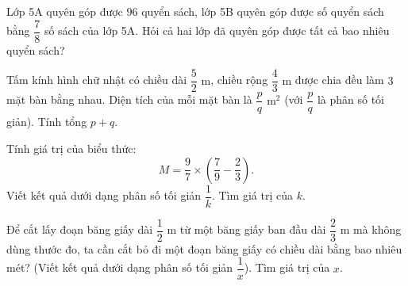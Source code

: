\begin{ex} %
Lớp 5A quyên góp được $96$ quyển sách, lớp 5B quyên góp được số quyển sách bằng $\dfrac{7}{8}$ số sách của lớp 5A. Hỏi cả hai lớp đã quyên góp được tất cả bao nhiêu quyển sách?
\end{ex}

\begin{ex} %
Tấm kính hình chữ nhật có chiều dài $\dfrac{5}{2}\text{ m}$, chiều rộng $\dfrac{4}{3}\text{ m}$ được chia đều làm $3$ mặt bàn bằng nhau. Diện tích của mỗi mặt bàn là $\dfrac{p}{q}\text{ m}^2$ (với $\dfrac{p}{q}$ là phân số tối giản). Tính tổng $p + q$.
\end{ex}

\begin{ex} %
Tính giá trị của biểu thức:
\[
M = \dfrac{9}{7} \times \left(\dfrac{7}{9} - \dfrac{2}{3}\right).
\]
Viết kết quả dưới dạng phân số tối giản $\dfrac{1}{k}$. Tìm giá trị của $k$.
\end{ex}

\begin{ex} %
Để cắt lấy đoạn băng giấy dài $\dfrac{1}{2}\text{ m}$ từ một băng giấy ban đầu dài $\dfrac{2}{3}\text{ m}$ mà không dùng thước đo, ta cần cắt bỏ đi một đoạn băng giấy có chiều dài bằng bao nhiêu mét? (Viết kết quả dưới dạng phân số tối giản $\dfrac{1}{x}$). Tìm giá trị của $x$.
\end{ex}
